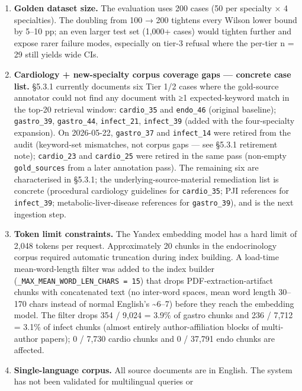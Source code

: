 \documentclass[
  american,
  a4paper,
]{article}
\begin{document}
\begin{enumerate}
\def\labelenumi{\arabic{enumi}.}
\item
  \textbf{Golden dataset size.} The evaluation uses 200 cases (50 per
  specialty × 4 specialties). The doubling from 100 → 200 tightens every
  Wilson lower bound by 5--10 pp; an even larger test set (1,000+ cases)
  would tighten further and expose rarer failure modes, especially on
  tier-3 refusal where the per-tier n = 29 still yields wide CIs.
\item
  \textbf{Cardiology + new-specialty corpus coverage gaps --- concrete
  case list.} §5.3.1 currently documents six Tier 1/2 cases where the
  gold-source annotator could not find any document with ≥1
  expected-keyword match in the top-20 retrieval window:
  \texttt{cardio\_35} and \texttt{endo\_46} (original baseline);
  \texttt{gastro\_39}, \texttt{gastro\_44}, \texttt{infect\_21},
  \texttt{infect\_39} (added with the four-specialty expansion). On
  2026-05-22, \texttt{gastro\_37} and \texttt{infect\_14} were retired
  from the audit (keyword-set mismatches, not corpus gaps --- see §5.3.1
  retirement note); \texttt{cardio\_23} and \texttt{cardio\_25} were
  retired in the same pass (non-empty \texttt{gold\_sources} from a
  later annotation pass). The remaining six are characterised in §5.3.1;
  the underlying-source-material remediation list is concrete
  (procedural cardiology guidelines for \texttt{cardio\_35}; PJI
  references for \texttt{infect\_39}; metabolic-liver-disease references
  for \texttt{gastro\_39}), and is the next ingestion step.
\item
  \textbf{Token limit constraints.} The Yandex embedding model has a
  hard limit of 2,048 tokens per request. Approximately 20 chunks in the
  endocrinology corpus required automatic truncation during index
  building. A load-time mean-word-length filter was added to the index
  builder (\texttt{\_MAX\_MEAN\_WORD\_LEN\_CHARS\ =\ 15}) that drops
  PDF-extraction-artifact chunks with concatenated text (no inter-word
  spaces, mean word length 30--170 chars instead of normal English's
  \textasciitilde6--7) before they reach the embedding model. The filter
  drops 354 / 9,024 = 3.9\% of gastro chunks and 236 / 7,712 = 3.1\% of
  infect chunks (almost entirely author-affiliation blocks of
  multi-author papers); 0 / 7,730 cardio chunks and 0 / 37,791 endo
  chunks are affected.
\item
  \textbf{Single-language corpus.} All source documents are in English.
  The system has not been validated for multilingual queries or

\end{enumerate}
\end{document}

